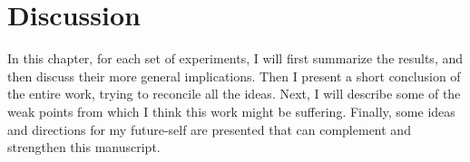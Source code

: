\chapter{Discussion}
\label{ch:discussion}
In this chapter, for each set of experiments, I will first summarize the results, and then discuss their more general implications.
Then I present a short conclusion of the entire work, trying to reconcile all the ideas.
Next, I will describe some of the weak points from which I think this work might be suffering.
Finally, some ideas and directions for my future-self are presented that can complement and strengthen this manuscript.




